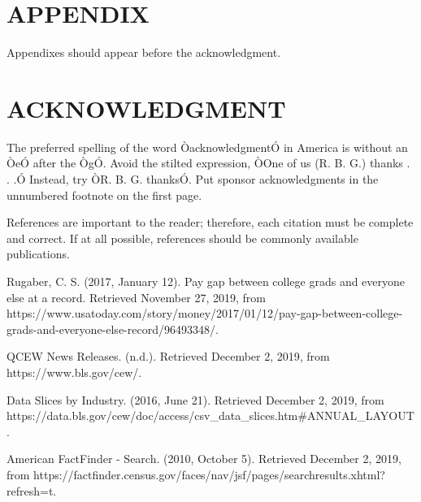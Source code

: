 \documentclass[letterpaper, 10 pt, conference]{ieeeconf}  %
\begin{document}
\section*{APPENDIX}

Appendixes should appear before the acknowledgment.

\section*{ACKNOWLEDGMENT}

The preferred spelling of the word ÒacknowledgmentÓ in America is without an ÒeÓ after the ÒgÓ. Avoid the stilted expression, ÒOne of us (R. B. G.) thanks . . .Ó  Instead, try ÒR. B. G. thanksÓ. Put sponsor acknowledgments in the unnumbered footnote on the first page.




References are important to the reader; therefore, each citation must be complete and correct. If at all possible, references should be commonly available publications.



\begin{thebibliography}{99}

 Rugaber, C. S. (2017, January 12). Pay gap between college grads and everyone else at a record. Retrieved November 27, 2019, from https://www.usatoday.com/story/money/2017/01/12/pay-gap-between-college-grads-and-everyone-else-record/96493348/.

 QCEW News Releases. (n.d.). Retrieved December 2, 2019, from https://www.bls.gov/cew/.

 Data Slices by Industry. (2016, June 21). Retrieved December 2, 2019, from \newline
https://data.bls.gov/cew/doc/access/csv\_data\_slices.htm\#ANNUAL\_LAYOUT.

 American FactFinder - Search. (2010, October 5). Retrieved December 2, 2019, from \newline https://factfinder.census.gov/faces/nav/jsf/pages/searchresults.xhtml?refresh=t.

\end{thebibliography}
\end{document}
